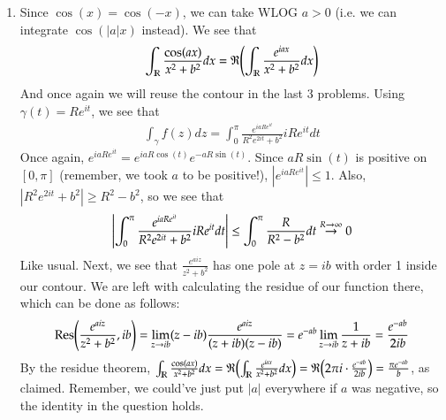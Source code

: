 \documentclass[12pt]{article}
\def\mbb#1{\mathbb{#1}}
\def \R{\mbb{R}}
\theoremstyle{definition}
\theoremstyle{remark}
\renewcommand{\Re}{\mathfrak{R}\qty}
\begin{document}
\begin{enumerate}[leftmargin=\labelsep]
		\item Since $\cos(x) = \cos(-x)$, we can take WLOG $a > 0$ (i.e. we can integrate $\cos(|a|x)$ instead). We see that 
		\begin{align*}
			\int_\R \frac{\cos(ax)}{x^2+b^2}dx = \Re(\int_\R \frac{e^{iax}}{x^2+b^2}dx)
		\end{align*}
		And once again we will reuse the contour in the last 3 problems. Using $\gamma(t) = Re^{it}$, we see that 
		\begin{align*}
			\int_\gamma f(z)dz = \int_0^\pi \frac{e^{iaRe^{it}}}{R^2e^{2it} + b^2} iRe^{it}dt
		\end{align*}
		Once again, $e^{iaRe^{it}} = e^{iaR\cos(t)} e^{-aR\sin(t)}$. Since $aR\sin(t)$ is positive on $[0, \pi]$ (remember, we took $a$ to be positive!), $|e^{iaRe^{it}}| \leq 1$. Also, $|R^2e^{2it} + b^2| \geq R^2 - b^2$, so we see that
		\begin{align*}
			\qty|\int_0^\pi \frac{e^{iaRe^{it}}}{R^2e^{2it} + b^2} iRe^{it}dt| \leq \int_0^\pi \frac{R}{R^2-b^2}dt \overset{R \to \infty}{\to} 0
		\end{align*}
		Like usual. Next, we see that $\frac{e^{aiz}}{z^2+b^2}$ has one pole at $z = ib$ with order 1 inside our contour. We are left with calculating the residue of our function there, which can be done as follows:
		\begin{align*}
			\Res(\frac{e^{aiz}}{z^2+b^2}, ib) = \lim_{z \to ib} (z-ib)\frac{e^{aiz}}{(z+ib)(z-ib)} = e^{-ab} \lim_{z \to ib} \frac{1}{z+ib} = \frac{e^{-ab}}{2ib}
		\end{align*}
		By the residue theorem, $\int_\R \frac{\cos(ax)}{x^2+b^2}dx = \Re(\int_\R \frac{e^{iax}}{x^2+b^2}dx)  = \Re(2\pi i \cdot \frac {e^{-ab}}{2ib}) = \frac{\pi e^{-ab}}{b}$, as claimed. Remember, we could've just put $|a|$ everywhere if $a$ was negative, so the identity in the question holds.
		

\end{enumerate}
\end{document}
